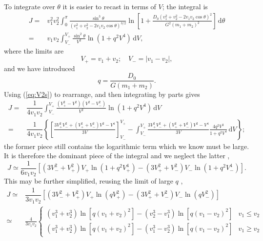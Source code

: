 \documentclass[useAMS,usedcolumn,usegraphicx,usenatbib]{mn2e}
\newcommand{\eqnref}[1]{(\ref{eq:#1})}
\newcommand{\dd}{\ensuremath{\mathrm{d}}}
\newcommand{\intd}[4]{\ensuremath{\displaystyle \int_{#1}^{#2}{#3}\,\dd{#4}}}
\newcommand{\recip}[1]{\ensuremath{\dfrac{1}{#1}}}
\begin{document}
\begin{onecolumn}
To integrate over $\theta$ it is easier to recast in terms of $V$; the integral is
\begin{align}
J = {} & v_1^2 v_2^2 \intd{0}{\pi}{\frac{\sin^3\theta}{\left(v_1^2 + v_2^2 - 2v_1 v_2 \cos\theta\right)^{3/2}}\ln\left[1 + \frac{D_0\left(v_1^2 + v_2^2 - 2v_1 v_2 \cos\theta\right)^2}{G^2\left(m_1 + m_2\right)^2}\right]}{\theta} \\
 = {} & v_1 v_2 \intd{V_-}{V_+}{\frac{\sin^2\theta}{V^2}\ln\left(1 + q^2V^4\right)}{V},
\end{align}
where the limits are
\begin{equation}
V_+ = v_1 + v_2; \quad V_- = |v_1 - v_2|,
\end{equation}
and we have introduced
\begin{equation}
q = \frac{D_0}{G\left(m_1+m_2\right)}.
\end{equation}
Using \eqnref{V2s} to rearrange, and then integrating by parts gives
\begin{align}
J = {} & \recip{4 v_1 v_2} \intd{V_-}{V_+}{\frac{\left(V_+^2 - V^2\right)\left(V^2 - V_-^2\right)}{V^2}\ln\left(1 + q^2V^4\right)}{V} \\
 = {} & \recip{4 v_1 v_2} \left\{\left[\frac{3V_+^2V_-^2 + \left(V_+^2 + V_-^2\right)V^2 - V^4}{3V}\right]^{V_+}_{V_-} - \intd{V_-}{V_+}{\frac{3V_+^2V_-^2 + \left(V_+^2 + V_-^2\right)V^2 - V^4}{3V}\frac{4q^2V^3}{1+ q^2V^4}}{V}\right\};
\end{align}
the former piece still contains the logarithmic term which we know must be large. It is therefore the dominant piece of the integral and we neglect the latter \citep{Chandrasekhar1941},
\begin{equation}
J \simeq \recip{6 v_1 v_2} \left[\left(3V_-^2 + V_+^2\right)V_+\ln\left(1 + q^2V_+^4\right) - \left(3V_+^2 + V_-^2\right)V_-\ln\left(1 + q^2V_-^4\right)\right].
\end{equation}
This may be further simplified, reusing the limit of large $q$ \citep{Chandrasekhar1941,Chandrasekhar1941b},
\begin{align}
J \simeq {} & \recip{3 v_1 v_2} \left[\left(3V_-^2 + V_+^2\right)V_+\ln\left(qV_+^2\right) - \left(3V_+^2 + V_-^2\right)V_-\ln\left(qV_-^2\right)\right] \\
 \simeq {} & \frac{4}{3v_1v_2}\begin{cases}
\left(v_1^3 + v_2^3\right)\ln\left[q\left(v_1 + v_2\right)^2\right] - \left(v_2^3 - v_1^3\right)\ln\left[q\left(v_1 - v_2\right)^2\right] & v_1 \leq v_2 \\
\left(v_1^3 + v_2^3\right)\ln\left[q\left(v_1 + v_2\right)^2\right] - \left(v_1^3 - v_2^3\right)\ln\left[q\left(v_1 - v_2\right)^2\right] & v_1 \geq v_2

\end{cases}
\end{align}
\end{onecolumn}
\end{document}
